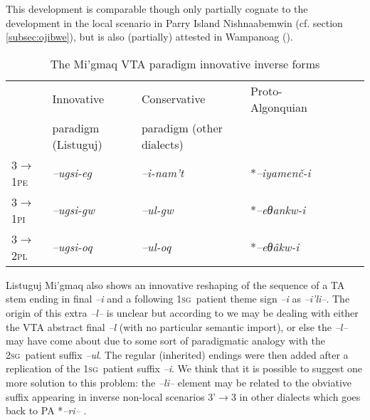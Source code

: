 \documentclass[twoside,a4paper,11pt]{article}
\newcommand{\ipa}[1]{{\phon\textit{#1}}}
\newcommand{\sg}{\textsc{sg}}
\newcommand{\pl}{\textsc{pl}}
\newcommand{\grise}[1]{\cellcolor{lightgray}\textbf{#1}}
\newcommand{\pli}{\textsc{pi}}
\newcommand{\pe}{\textsc{pe}}
\begin{document}
This development is comparable though only partially cognate to the development in the local scenario in Parry Island Nishnaabemwin (cf. section \ref{subsec:ojibwe}), but is also (partially) attested in Wampanoag (\citealp[556]{bragdon}).

\begin{table}[H]
\caption{The Mi'gmaq VTA paradigm innovative inverse forms}
\centering \label{tab:migmaq.vta.innov}
\begin{tabular}{lllllll}
\toprule
& Innovative & Conservative & Proto-Algonquian \\
&paradigm (Listuguj) & paradigm (other dialects) &\\
\midrule
3$\rightarrow$1\pe & 	\ipa{--ugsi-eg} \grise{}& 	\ipa{--i-nam't} &  *\ipa{--iyamenč-i} & 		\\
\textsc{3$\rightarrow$1\pli} & 	\ipa{--ugsi-gw} \grise{}& 	\ipa{--ul-gw}  &*\ipa{--eθankw-i} & 		\\
\midrule
3$\rightarrow$2\pl & \ipa{--ugsi-oq} \grise{}& 	\ipa{--ul-oq} & *\ipa{--eθâkw-i} & 		\\
\bottomrule
\end{tabular}
\end{table}

Listuguj Mi'gmaq also shows an innovative reshaping of the sequence of a TA stem ending in final \ipa{--i} and a following 1\sg\ patient theme sign \ipa{--i} as \ipa{--i'li--}. The origin of this extra \ipa{--l--} is unclear but according to \cite{Quinn12} we may be dealing with either the VTA abstract final \ipa{--l} (with no particular semantic import), or else the \ipa{--l--} may have come about due to some sort of paradigmatic analogy with the 2\sg\ patient suffix \ipa{--ul}. The regular (inherited) endings were then added after a replication of the 1\sg\ patient suffix \ipa{--i}. We think that it is possible to suggest one more solution to this problem: the \ipa{--li--} element may be related to the obviative suffix appearing in inverse non-local scenarios 3'$\rightarrow$3 in other dialects which goes back to PA *\ipa{--ri--} .
\end{document}

